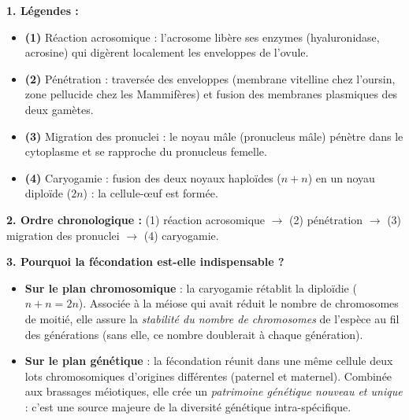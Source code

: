 \documentclass[11pt]{article}
\newcommand{\cle}[1]{{\popxbold\color{popdark}#1}}
\begin{document}
\begin{corrige}
\textbf{1. Légendes :}
\begin{itemize}
\item \textbf{(1)} \cle{Réaction acrosomique} : l'acrosome libère ses enzymes (hyaluronidase, acrosine) qui digèrent localement les enveloppes de l'ovule.
\item \textbf{(2)} \cle{Pénétration} : traversée des enveloppes (membrane vitelline chez l'oursin, zone pellucide chez les Mammifères) et fusion des membranes plasmiques des deux gamètes.
\item \textbf{(3)} \cle{Migration des pronuclei} : le noyau mâle (pronucleus mâle) pénètre dans le cytoplasme et se rapproche du pronucleus femelle.
\item \textbf{(4)} \cle{Caryogamie} : fusion des deux noyaux haploïdes ($n + n$) en un noyau diploïde ($2n$) : la cellule-œuf est formée.
\end{itemize}

\textbf{2. Ordre chronologique :} (1) réaction acrosomique $\rightarrow$ (2) pénétration $\rightarrow$ (3) migration des pronuclei $\rightarrow$ (4) caryogamie.

\textbf{3. Pourquoi la fécondation est-elle indispensable ?}
\begin{itemize}
\item \textbf{Sur le plan chromosomique} : la caryogamie rétablit la diploïdie ($n + n = 2n$). Associée à la méiose qui avait réduit le nombre de chromosomes de moitié, elle assure la \emph{stabilité du nombre de chromosomes} de l'espèce au fil des générations (sans elle, ce nombre doublerait à chaque génération).
\item \textbf{Sur le plan génétique} : la fécondation réunit dans une même cellule deux lots chromosomiques d'origines différentes (paternel et maternel). Combinée aux brassages méiotiques, elle crée un \emph{patrimoine génétique nouveau et unique} : c'est une source majeure de la diversité génétique intra-spécifique.
\end{itemize}
\end{corrige}
\end{document}
